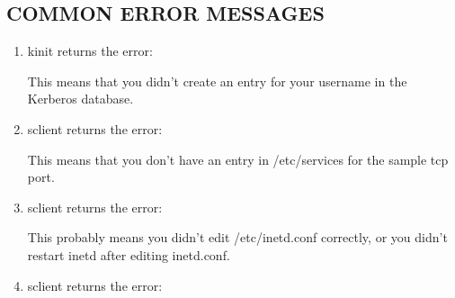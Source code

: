 \documentclass[letterpaper,10pt,english]{sphinxmanual}
\begin{document}
\subsection{COMMON ERROR MESSAGES}
\label{\detokenize{admin/admin_commands/sserver:common-error-messages}}\begin{enumerate}
\item {} 
kinit returns the error:

%
\begin{sphinxVerbatim}[commandchars=\\\{\}]
        
        
\end{sphinxVerbatim}

This means that you didn’t create an entry for your username in the
Kerberos database.

\item {} 
sclient returns the error:

%
\begin{sphinxVerbatim}[commandchars=\\\{\}]
    
\end{sphinxVerbatim}

This means that you don’t have an entry in /etc/services for the
sample tcp port.

\item {} 
sclient returns the error:

%
\begin{sphinxVerbatim}[commandchars=\\\{\}]
  
\end{sphinxVerbatim}

This probably means you didn’t edit /etc/inetd.conf correctly, or
you didn’t restart inetd after editing inetd.conf.

\item {} 
sclient returns the error:

%
\begin{sphinxVerbatim}[commandchars=\\\{\}]
        
\end{sphinxVerbatim}


\end{enumerate}
\end{document}

